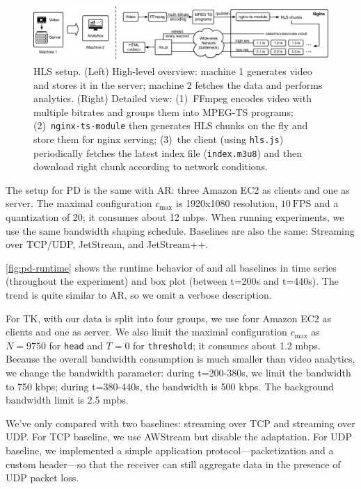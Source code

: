 \documentclass[twocolumn, 9pt]{article}
\begin{document}
\begin{figure}[!htb]
  \centering
  \includegraphics[width=\textwidth]{figures/hls-arch.pdf}
  \caption{HLS setup. (Left) High-level overview: machine 1 generates video and
    stores it in the server; machine 2 fetches the data and performs
    analytics. (Right) Detailed view: (1)~FFmpeg encodes video with multiple
    bitrates and groups them into MPEG-TS programs; (2)~\texttt{nginx-ts-module}
    then generates HLS chunks on the fly and store them for nginx serving;
    (3)~the client (using \texttt{hls.js}) periodically fetches the latest index
    file (\texttt{index.m3u8}) and then download right chunk according to
    network conditions.}
  \label{fig:hls-arch}
\end{figure}

 The setup for PD is the same with AR: three Amazon
EC2 as clients and one as server. The maximal configuration $c_{\max}$ is
1920x1080 resolution, \(10~\text{FPS}\) and a quantization of 20; it consumes
about 12 mbps. When running experiments, we use the same bandwidth shaping
schedule. Baselines are also the same: Streaming over TCP/UDP, JetStream, and
JetStream++.

\autoref{fig:pd-runtime} shows the runtime behavior of \sysname{} and all
baselines in time series (throughout the experiment) and box plot (between
t=200s and t=440s). The trend is quite similar to AR, so we omit a verbose
description.

 For TK, with our data is split into four groups, we use four
Amazon EC2 as clients and one as server. We also limit the maximal configuration
$c_{\max}$ as $N=9750$ for \texttt{head} and $T=0$ for \texttt{threshold}; it
consumes about 1.2 mbps. Because the overall bandwidth consumption is much
smaller than video analytics, we change the bandwidth parameter: during
t=200-380s, we limit the bandwidth to 750 kbps; during t=380-440s, the bandwidth
is 500 kbps. The background bandwidth limit is 2.5 mpbs.

We've only compared \sysname{} with two baselines: streaming over TCP and
streaming over UDP. For TCP baseline, we use AWStream but disable the
adaptation. For UDP baseline, we implemented a simple application
protocol---packetization and a custom header---so that the receiver can still
aggregate data in the presence of UDP packet loss.
\end{document}
